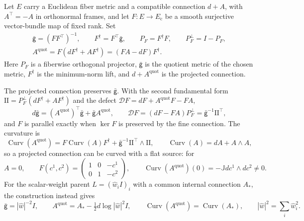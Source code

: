 Let \(E\) carry a Euclidean fiber metric and a compatible connection \(d+A\), with
\(A^\top=-A\) in orthonormal frames, and let \(F:E\to E_{\mathrm c}\) be a smooth
surjective vector-bundle map of fixed rank. Set
\begin{equation}
\begin{gathered}
 \bar{\mathsf g}=(FF^\top)^{-1},\qquad F^\dagger=F^\top\bar{\mathsf g},\qquad
 P_F=F^\dagger F,\qquad P_F^\perp=I-P_F,\\
 A^{\mathrm{quot}}=F(dF^\dagger+AF^\dagger)=(FA-dF)F^\dagger.
\end{gathered}
\label{eq:rg-cover-quotient-data}
\end{equation}
Here \(P_F\) is a fiberwise orthogonal projector, \(\bar{\mathsf g}\) is the
quotient metric of the chosen metric, \(F^\dagger\) is the minimum-norm lift, and
\(d+A^{\mathrm{quot}}\) is the projected connection.

The projected connection preserves \(\bar{\mathsf g}\). With the second fundamental
form \(\mathrm{II}=P_F^\perp(dF^\dagger+AF^\dagger)\) and the defect
\(\mathcal DF=dF+A^{\mathrm{quot}}F-FA\),
\begin{equation}
 d\bar{\mathsf g}=(A^{\mathrm{quot}})^\top\bar{\mathsf g}+\bar{\mathsf g}A^{\mathrm{quot}},\qquad
 \mathcal DF=(dF-FA)P_F^\perp=\bar{\mathsf g}^{-1}\mathrm{II}^\top,
\label{eq:rg-cover-projected-defect}
\end{equation}
and \(F\) is parallel exactly when \(\ker F\) is preserved by the fine connection.
The curvature is
\begin{equation}
 \operatorname{Curv}(A^{\mathrm{quot}})=F\operatorname{Curv}(A)F^\dagger
 +\bar{\mathsf g}^{-1}\mathrm{II}^\top\wedge\mathrm{II},
 \qquad \operatorname{Curv}(A)=dA+A\wedge A,
\label{eq:rg-cover-projected-curvature}
\end{equation}
so a projected connection can be curved with a flat source: for
\begin{equation}
 A=0,\qquad F(c^1,c^2)=\begin{pmatrix}1&0&-c^1\\0&1&-c^2\end{pmatrix},
 \qquad \operatorname{Curv}(A^{\mathrm{quot}})(0)=-\mathbb Jdc^1\wedge dc^2\ne0.
\label{eq:rg-cover-projected-curvature-example}
\end{equation}
For the scalar-weight parent \(L=(\widehat w_iI)_i\) with a common internal
connection \(A_*\), the construction instead gives
\begin{equation}
 \bar{\mathsf g}=|\widehat w|^{-2}I,\qquad
 A^{\mathrm{quot}}=A_*-\tfrac12d\log|\widehat w|^2I,\qquad
 \operatorname{Curv}(A^{\mathrm{quot}})=\operatorname{Curv}(A_*),
 \qquad |\widehat w|^2=\sum_i\widehat w_i^2.
\label{eq:rg-cover-scalar-weight-quotient}
\end{equation}

